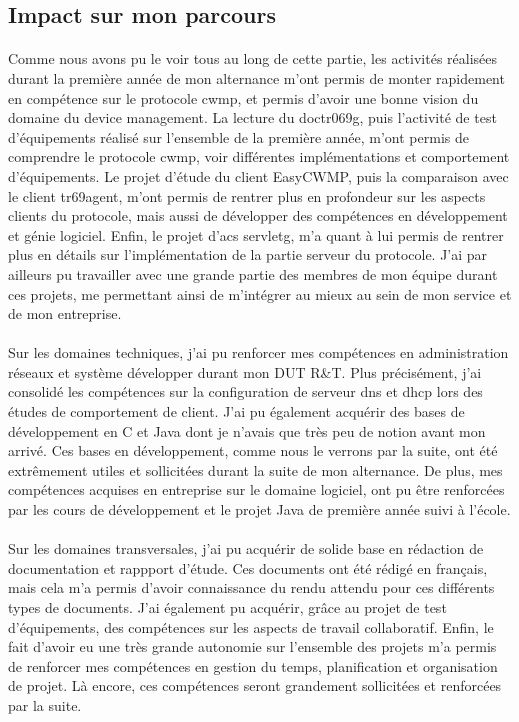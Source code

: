 \documentclass[12pt,a4paper]{report}
\begin{document}
\subsection{Impact sur mon parcours}
\paragraph*{}Comme nous avons pu le voir tous au long de cette partie, les activités réalisées durant la première année de mon alternance m'ont permis de monter rapidement en compétence sur le protocole \gls{cwmp}, et permis d'avoir une bonne vision du domaine du device management. La lecture du \gls{doctr069g}, puis l'activité de test d'équipements réalisé sur l'ensemble de la première année, m'ont permis de comprendre le protocole \gls{cwmp}, voir différentes implémentations et comportement d'équipements. Le projet d'étude du client EasyCWMP, puis la comparaison avec le client tr69agent, m'ont permis de rentrer plus en profondeur sur les aspects clients du protocole, mais aussi de développer des compétences en développement et génie logiciel. Enfin, le projet d'\gls{acs} \gls{servletg}, m'a quant à lui permis de rentrer plus en détails sur l'implémentation de la partie serveur du protocole. J'ai par ailleurs pu travailler avec une grande partie des membres de mon équipe durant ces projets, me permettant ainsi de m'intégrer au mieux au sein de mon service et de mon entreprise. 
\paragraph*{}Sur les domaines techniques, j'ai pu renforcer mes compétences en administration réseaux et système développer durant mon DUT R\&T. Plus précisément, j'ai consolidé les compétences sur la configuration de serveur \gls{dns} et \gls{dhcp} lors des études de comportement de client. J'ai pu également acquérir des bases de développement en C et Java dont je n'avais que très peu de notion avant mon arrivé. Ces bases en développement, comme nous le verrons par la suite, ont été extrêmement utiles et sollicitées durant la suite de mon alternance. De plus, mes compétences acquises en entreprise sur le domaine logiciel, ont pu être renforcées par les cours de développement et le projet Java de première année suivi à l'école. 
\paragraph*{}Sur les domaines transversales, j'ai pu acquérir de solide base en rédaction de documentation et rappport d'étude. Ces documents ont été rédigé en français, mais cela m'a permis d'avoir connaissance du rendu attendu pour ces différents types de documents. J'ai également pu acquérir, grâce au projet de test d'équipements, des compétences sur les aspects de travail collaboratif. Enfin, le fait d'avoir eu une très grande autonomie sur l'ensemble des projets m'a permis de renforcer mes compétences en gestion du temps, planification et organisation de projet. Là encore, ces compétences seront grandement sollicitées et renforcées par la suite.
\end{document}
